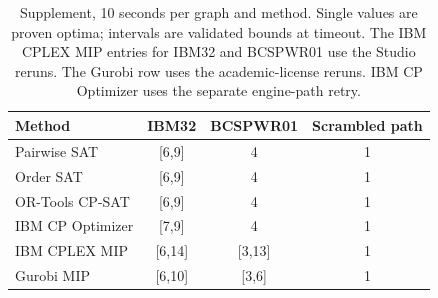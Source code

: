\begin{table}[htbp]\centering\small
\caption{Supplement, 10 seconds per graph and method. Single values are proven optima; intervals are validated bounds at timeout. The IBM CPLEX MIP entries for IBM32 and BCSPWR01 use the Studio reruns. The Gurobi row uses the academic-license reruns. IBM CP Optimizer uses the separate engine-path retry.}
\label{tab:supplement}\begin{tabular}{lccc}\hline
Method & IBM32 & BCSPWR01 & Scrambled path\\\hline
Pairwise SAT & [6,9] & 4 & 1\\
Order SAT & [6,9] & 4 & 1\\
OR-Tools CP-SAT & [6,9] & 4 & 1\\
IBM CP Optimizer & [7,9] & 4 & 1\\
IBM CPLEX MIP & [6,14] & [3,13] & 1\\
Gurobi MIP & [6,10] & [3,6] & 1\\
\hline\end{tabular}\end{table}
